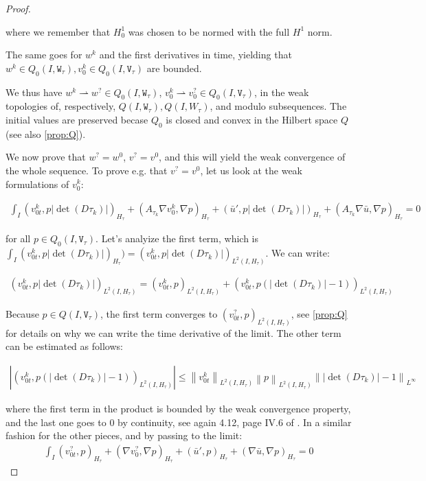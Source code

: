 \documentclass[english,a4paper,9pt,oneside]{scrbook}	%
\theoremstyle{break}
\newenvironment{mproof}[1][\proofname]{%
  \begin{proof}[#1]$ $\par\nobreak\ignorespaces
}{%
  \end{proof}
}
\renewcommand*{\proofname}{Proof}
\theoremstyle{remark}
\newcommand{\norm}[1]{\left\lVert#1\right\rVert}
\newcommand{\weakc}{\rightharpoonup}
\newcommand{\tw}[1]{\texttt{#1}}
\begin{document}
\begin{mproof}
where we remember that $H^1_0$ was chosen to be normed with the full $H^1$ norm.

The same goes for $w^k$ and the first derivatives in time, yielding that $w^k \in Q_0(I, \tw{W}_{ \tau}), v_0^k \in Q_0(I,\tw{V}_{\tau})$ are bounded.

We thus have $w^k\weakc w^? \in Q_0(I, \tw{W}_{ \tau})$, $v_0^k \weakc v_0^? \in Q_0(I,\tw{V}_{\tau})$, in the weak topologies of, respectively, $Q(I, \tw{W}_{ \tau}), Q(I,W_{\tau})$, and modulo subsequences. The initial values are preserved becase $Q_0$ is closed and convex in the Hilbert space $Q$ (see also \cref{prop:Q}). 

We now prove that $w^?=w^0$, $v^?=v^0$, and this will yield the weak convergence of the whole sequence.
To prove e.g. that $v^?=v^0$, let us look at the weak formulations of $v_0^k$:

\begin{align*}
\int_I (v_{0t}^k,p |\det(D\tau_k)|)_{H_\tau} + (A_{\tau_k} \nabla v_0^k, \nabla p)_{H_\tau}+(\bar{u}',p|\det(D\tau_k)|)_{H_\tau}+(A_{\tau_k} \nabla \bar{u} , \nabla p)_{H_\tau} = 0
\end{align*}

for all $p \in Q_0(I,\tw{V}_{\tau})$.
Let's analyize the first term, which is $\int_I (v_{0t}^k,p |\det(D\tau_k)|)_{H_\tau} ) =(v_{0t}^k,p |\det(D\tau_k)|)_{L^2(I,H_\tau)}$.
We can write:

\begin{align*}
(v_{0t}^k,p |\det(D\tau_k)|)_{L^2(I,H_\tau)} = (v_{0t}^k,p )_{L^2(I,H_\tau)} + (v_{0t}^k,p (|\det(D\tau_k)|-1))_{L^2(I,H_\tau)}
\end{align*}

Because $p \in  Q(I,\tw{V}_{\tau})$, the first term converges to $(v_{0t}^?,p )_{L^2(I,H_\tau)}$, see \cref{prop:Q} for details on why we can write the time derivative of the limit. The other term can be estimated as follows:

\begin{align*}
|(v_{0t}^k,p (|\det(D\tau_k)|-1))_{L^2(I,H_\tau)}|\leq\norm{v_{0t}^k}_{L^2(I,H_\tau)}\norm{p }_{L^2(I,H_\tau)} \norm{|\det(D\tau_k)|-1}_{L^\infty}
\end{align*}

where the first term in the product is bounded by the weak convergence property, and the last one goes to $0$ by continuity, see again 4.12, page IV.6 of \cite{murat}. 
In a similar fashion for the other pieces, and by passing to the limit:
\begin{align*}
\int_I (v_{0t}^?,p)_{H_\tau} + (\nabla v_0^?, \nabla p)_{H_\tau}+(\bar{u}',p)_{H_\tau}+(\nabla \bar{u} , \nabla p)_{H_\tau} = 0
\end{align*}


\end{mproof}
\end{document}
